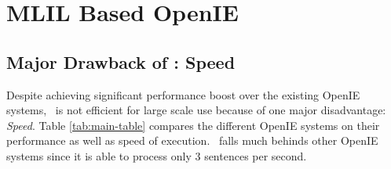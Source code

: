 \section{MLIL Based OpenIE}

    \subsection{Major Drawback of \shortname: Speed}

        Despite achieving significant performance boost over the existing OpenIE systems, \shortname\ is not efficient for large scale use because of one major disadvantage: \emph{Speed}. Table \ref{tab:main-table} compares the different OpenIE systems on their performance as well as speed of execution. \shortname\ falls much behinds other OpenIE systems since it is able to process only 3 sentences per second.

